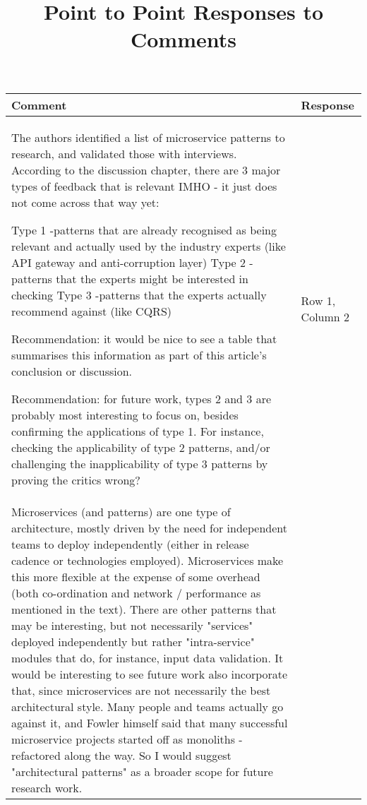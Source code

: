 \documentclass{article}
\begin{document}
\title{Point to Point Responses to Comments}

\maketitle



\begin{longtable}{|p{7cm}|p{7cm}|}
   
    \hline
    \rule[-1.5ex]{0pt}{4.5ex} Comment & Response \\ \hline
    \rule[-1.5ex]{0pt}{4.5ex} The authors identified a list of microservice patterns to research, and validated those with interviews. According to the discussion chapter, there are 3  major types of feedback that is relevant IMHO - it just does not come across that way yet:

    Type 1 -patterns that are already recognised as being relevant and actually used by the industry experts (like API gateway and anti-corruption layer)
    Type 2 -patterns that the experts might be interested in checking
    Type 3 -patterns that the experts actually recommend against (like CQRS)

    Recommendation: it would be nice to see a table that summarises this information as part of this article's conclusion or discussion.

    Recommendation: for future work, types 2 and 3 are probably most interesting to focus on, besides confirming the applications of type 1. For instance, checking the applicability of type 2 patterns, and/or challenging the inapplicability of type 3 patterns by proving the 
    critics wrong? & Row 1, Column 2 \\ \hline

    \rule[-1.5ex]{0pt}{4.5ex} Microservices (and patterns) are one type of architecture, mostly driven by the need for independent teams to deploy independently (either in release cadence or technologies employed). Microservices make this more flexible at the expense of some overhead (both co-ordination and network / performance as mentioned in the text). There are other patterns that may be interesting, but not necessarily "services" deployed independently but rather "intra-service" modules that do, for instance, input data validation. It would be interesting to see future work also incorporate that, since microservices are not necessarily the best architectural style. Many people and teams actually go against it, and Fowler himself said that many successful microservice projects started off as monoliths - refactored along the way.  So I would suggest "architectural patterns" as a broader scope for future research work.


\end{longtable}
\end{document}
